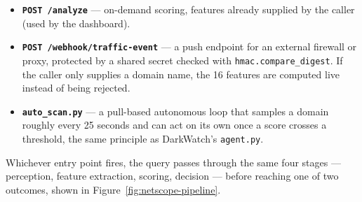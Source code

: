 \begin{itemize}[nosep]
\item \textbf{\texttt{POST /analyze}} --- on-demand scoring, features already supplied by the caller (used by the dashboard).
\item \textbf{\texttt{POST /webhook/traffic-event}} --- a push endpoint for an external firewall or proxy, protected by a shared secret checked with \texttt{hmac.compare\_digest}. If the caller only supplies a domain name, the 16 features are computed live instead of being rejected.
\item \textbf{\texttt{auto\_scan.py}} --- a pull-based autonomous loop that samples a domain roughly every 25 seconds and can act on its own once a score crosses a threshold, the same principle as DarkWatch's \texttt{agent.py}.
\end{itemize}

Whichever entry point fires, the query passes through the same four stages
--- perception, feature extraction, scoring, decision --- before reaching
one of two outcomes, shown in Figure~\ref{fig:netscope-pipeline}.

